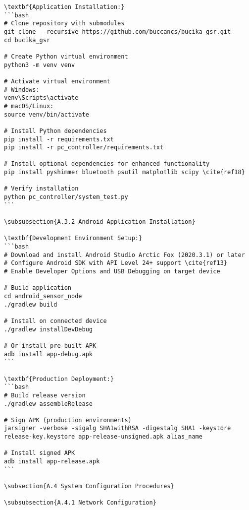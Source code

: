 \begin{verbatim}
\textbf{Application Installation:}
```bash
# Clone repository with submodules
git clone --recursive https://github.com/buccancs/bucika_gsr.git
cd bucika_gsr

# Create Python virtual environment
python3 -m venv venv

# Activate virtual environment
# Windows:
venv\Scripts\activate
# macOS/Linux:
source venv/bin/activate

# Install Python dependencies
pip install -r requirements.txt
pip install -r pc_controller/requirements.txt

# Install optional dependencies for enhanced functionality
pip install pyshimmer bluetooth psutil matplotlib scipy \cite{ref18}

# Verify installation
python pc_controller/system_test.py
```

\subsubsection{A.3.2 Android Application Installation}

\textbf{Development Environment Setup:}
```bash
# Download and install Android Studio Arctic Fox (2020.3.1) or later
# Configure Android SDK with API Level 24+ support \cite{ref13}
# Enable Developer Options and USB Debugging on target device

# Build application
cd android_sensor_node
./gradlew build

# Install on connected device
./gradlew installDevDebug

# Or install pre-built APK
adb install app-debug.apk
```

\textbf{Production Deployment:}
```bash
# Build release version
./gradlew assembleRelease

# Sign APK (production environments)
jarsigner -verbose -sigalg SHA1withRSA -digestalg SHA1 -keystore release-key.keystore app-release-unsigned.apk alias_name

# Install signed APK
adb install app-release.apk
```

\subsection{A.4 System Configuration Procedures}

\subsubsection{A.4.1 Network Configuration}


\end{verbatim}
